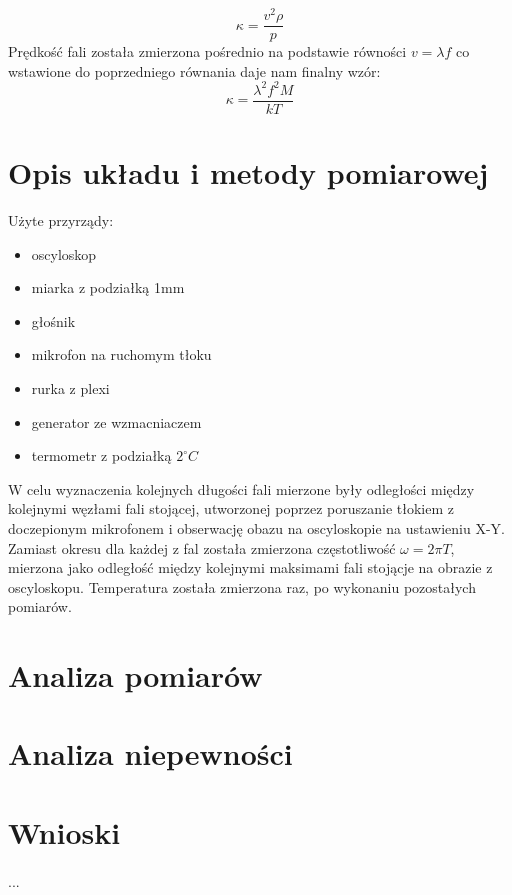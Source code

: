 \documentclass[a4paper,10pt]{article}
\begin{document}
\begin{equation}
  \kappa = \frac{v^2 \rho}{p}
\end{equation}
Prędkość fali została zmierzona pośrednio na podstawie równości $v = \lambda f$ co wstawione do poprzedniego równania daje nam finalny wzór:
\begin{equation}
  \kappa = \frac{\lambda^2 f^2 M}{kT}
\end{equation}

\section{Opis układu i metody pomiarowej}
Użyte przyrządy:
\begin{itemize}
  \item oscyloskop
  \item miarka z podziałką 1mm
  \item głośnik
  \item mikrofon na ruchomym tłoku
  \item rurka z plexi
  \item generator ze wzmacniaczem
  \item termometr z podziałką $2^\circ C$
\end{itemize}
W celu wyznaczenia kolejnych długości fali mierzone były odległości między kolejnymi węzłami fali stojącej, utworzonej poprzez poruszanie tłokiem z
doczepionym mikrofonem i obserwację obazu na oscyloskopie na ustawieniu X-Y.
Zamiast okresu dla każdej z fal została zmierzona częstotliwość $\omega = 2 \pi T$, mierzona jako odległość między kolejnymi maksimami fali stojącje na
obrazie z oscyloskopu. Temperatura została zmierzona raz, po wykonaniu pozostałych pomiarów.

\section{Analiza pomiarów}

\section{Analiza niepewności}

\section{Wnioski}
\paragraph{}...
\end{document}
